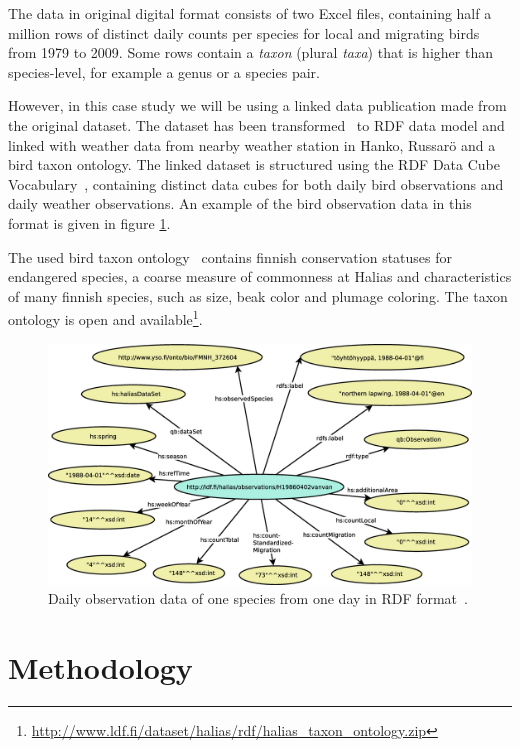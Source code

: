 \documentclass[english]{tktltiki2}
\begin{document}
The data in original digital format consists of two Excel files, containing half a million rows of distinct daily counts per species for local and migrating birds from 1979 to 2009. Some rows contain a \emph{taxon} (plural \emph{taxa}) that is higher than species-level, for example a genus or a species pair.

However, in this case study we will be using a linked data publication made from the original dataset. The dataset has been transformed~\cite{koho-hyvonen-orni-2014, koho2015gradu} to RDF data model and linked with weather data from nearby weather station in Hanko, Russarö and a bird taxon ontology.
The linked dataset is structured using the RDF Data Cube Vocabulary~\cite{w3crdfdatacube}, containing distinct data cubes for both daily bird observations and daily weather observations. An example of the bird observation data in this format is given in figure \ref{fig: havaintograafi}.

The used bird taxon ontology~\cite{koho2015gradu} contains finnish conservation statuses for endangered species, a coarse measure of commonness at Halias and characteristics of many finnish species, such as size, beak color and plumage coloring. The taxon ontology is open and available\footnote{\url{http://www.ldf.fi/dataset/halias/rdf/halias_taxon_ontology.zip}}.

\begin{figure}[htb]
\centering
\includegraphics[clip=true, width=\textwidth]{havaintograafi}
\caption{Daily observation data of one species from one day in RDF format~\cite{koho2015gradu}.}
\label{fig: havaintograafi}
\end{figure}


\section{Methodology}
\end{document}
